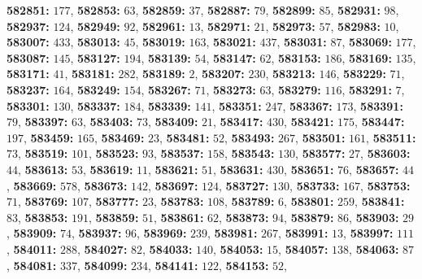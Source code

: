 \textsf{\bfseries 582851:} $177$, \textsf{\bfseries 582853:} $63$, \textsf{\bfseries 582859:} $37$, \textsf{\bfseries 582887:} $79$, \textsf{\bfseries 582899:} $85$, \textsf{\bfseries 582931:} $98$, \textsf{\bfseries 582937:} $124$, \textsf{\bfseries 582949:} $92$, \textsf{\bfseries 582961:} $13$, \textsf{\bfseries 582971:} $21$, \textsf{\bfseries 582973:} $57$, \textsf{\bfseries 582983:} $10$, \textsf{\bfseries 583007:} $433$, \textsf{\bfseries 583013:} $45$, \textsf{\bfseries 583019:} $163$, \textsf{\bfseries 583021:} $437$, \textsf{\bfseries 583031:} $87$, \textsf{\bfseries 583069:} $177$, \textsf{\bfseries 583087:} $145$, \textsf{\bfseries 583127:} $194$, \textsf{\bfseries 583139:} $54$, \textsf{\bfseries 583147:} $62$, \textsf{\bfseries 583153:} $186$, \textsf{\bfseries 583169:} $135$, \textsf{\bfseries 583171:} $41$, \textsf{\bfseries 583181:} $282$, \textsf{\bfseries 583189:} $2$, \textsf{\bfseries 583207:} $230$, \textsf{\bfseries 583213:} $146$, \textsf{\bfseries 583229:} $71$, \textsf{\bfseries 583237:} $164$, \textsf{\bfseries 583249:} $154$, \textsf{\bfseries 583267:} $71$, \textsf{\bfseries 583273:} $63$, \textsf{\bfseries 583279:} $116$, \textsf{\bfseries 583291:} $7$, \textsf{\bfseries 583301:} $130$, \textsf{\bfseries 583337:} $184$, \textsf{\bfseries 583339:} $141$, \textsf{\bfseries 583351:} $247$, \textsf{\bfseries 583367:} $173$, \textsf{\bfseries 583391:} $79$, \textsf{\bfseries 583397:} $63$, \textsf{\bfseries 583403:} $73$, \textsf{\bfseries 583409:} $21$, \textsf{\bfseries 583417:} $430$, \textsf{\bfseries 583421:} $175$, \textsf{\bfseries 583447:} $197$, \textsf{\bfseries 583459:} $165$, \textsf{\bfseries 583469:} $23$, \textsf{\bfseries 583481:} $52$, \textsf{\bfseries 583493:} $267$, \textsf{\bfseries 583501:} $161$, \textsf{\bfseries 583511:} $73$, \textsf{\bfseries 583519:} $101$, \textsf{\bfseries 583523:} $93$, \textsf{\bfseries 583537:} $158$, \textsf{\bfseries 583543:} $130$, \textsf{\bfseries 583577:} $27$, \textsf{\bfseries 583603:} $44$, \textsf{\bfseries 583613:} $53$, \textsf{\bfseries 583619:} $11$, \textsf{\bfseries 583621:} $51$, \textsf{\bfseries 583631:} $430$, \textsf{\bfseries 583651:} $76$, \textsf{\bfseries 583657:} $44$, \textsf{\bfseries 583669:} $578$, \textsf{\bfseries 583673:} $142$, \textsf{\bfseries 583697:} $124$, \textsf{\bfseries 583727:} $130$, \textsf{\bfseries 583733:} $167$, \textsf{\bfseries 583753:} $71$, \textsf{\bfseries 583769:} $107$, \textsf{\bfseries 583777:} $23$, \textsf{\bfseries 583783:} $108$, \textsf{\bfseries 583789:} $6$, \textsf{\bfseries 583801:} $259$, \textsf{\bfseries 583841:} $83$, \textsf{\bfseries 583853:} $191$, \textsf{\bfseries 583859:} $51$, \textsf{\bfseries 583861:} $62$, \textsf{\bfseries 583873:} $94$, \textsf{\bfseries 583879:} $86$, \textsf{\bfseries 583903:} $29$, \textsf{\bfseries 583909:} $74$, \textsf{\bfseries 583937:} $96$, \textsf{\bfseries 583969:} $239$, \textsf{\bfseries 583981:} $267$, \textsf{\bfseries 583991:} $13$, \textsf{\bfseries 583997:} $111$, \textsf{\bfseries 584011:} $288$, \textsf{\bfseries 584027:} $82$, \textsf{\bfseries 584033:} $140$, \textsf{\bfseries 584053:} $15$, \textsf{\bfseries 584057:} $138$, \textsf{\bfseries 584063:} $87$, \textsf{\bfseries 584081:} $337$, \textsf{\bfseries 584099:} $234$, \textsf{\bfseries 584141:} $122$, \textsf{\bfseries 584153:} $52$, 
